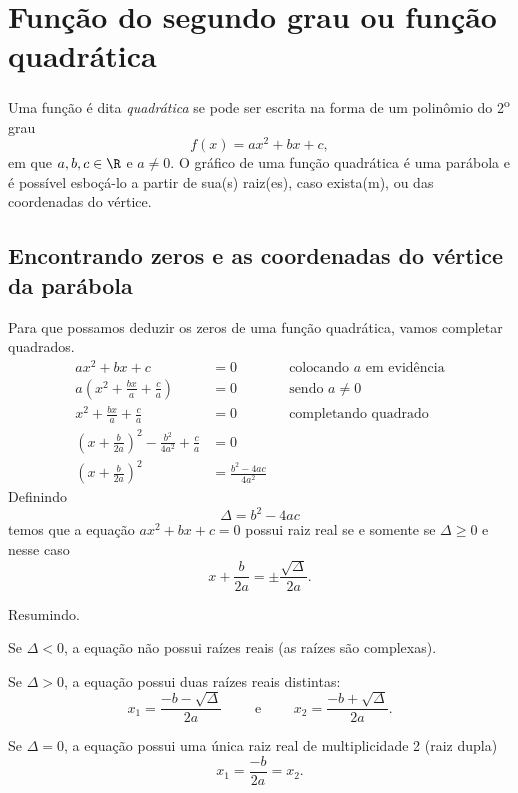 \section{Função do segundo grau ou função quadrática}

Uma função é dita
\emph{quadrática}
se pode ser escrita na forma de um polinômio do 2\textsuperscript{o} grau
\[
  f(x) = ax^2 + bx + c,
\]
em que $a, b, c \in \R$ e $a\neq 0$.
O gráfico de uma função quadrática é uma parábola e é possível
esboçá-lo a partir de sua(s) raiz(es), caso exista(m),
ou das coordenadas do vértice.

\subsection{Encontrando zeros e as coordenadas do vértice da parábola}

Para que possamos deduzir os zeros de uma função quadrática,
vamos completar quadrados.
\begin{align*}
  ax^2+bx+c & = 0                                   & & \text{colocando $a$ em evidência} \\[2mm]
  a \left(x^2+\frac{bx}{a}+\frac{c}{a}\right) & = 0 & & \text{sendo } a \neq 0 \\[2mm]
  x^2+\frac{bx}{a}+\frac{c}{a} & = 0                & & \text{completando quadrado} \\[2mm]
  \left(x+\frac{b}{2a}\right)^2-\frac{b^2}{4a^2}+\frac{c}{a} & = 0 \\
  \left(x+\frac{b}{2a}\right)^2 & = \frac{b^2-4ac}{4a^2}
\end{align*}
Definindo
\[
  \Delta = b^2-4ac
\]
temos que a equação $ax^2+bx+c=0$ possui raiz real
se e somente se $\Delta \geq 0$ e nesse caso
\[
  x+\frac{b}{2a} = \pm\frac{\sqrt{\Delta}}{2a}.
\]

\begin{observation}
Resumindo.

Se $\Delta < 0$, a equação não possui raízes reais (as raízes são
complexas).

Se $\Delta > 0$, a equação possui duas raízes reais distintas:
\[
  x_1 = \frac{-b-\sqrt{\Delta}}{2a} \qquad\text{ e }\qquad
  x_2 = \frac{-b+\sqrt{\Delta}}{2a}.
\]

Se $\Delta = 0$, a equação possui uma única raiz real de
multiplicidade 2 (raiz dupla)
\[
  x_1 = \frac{-b}{2a}=x_2.
\]
\end{observation}

